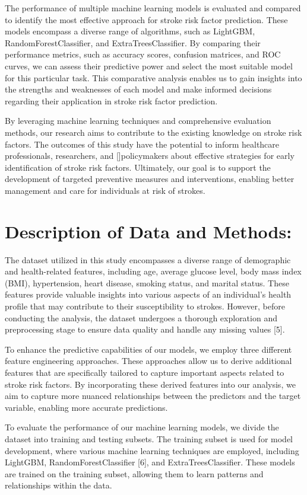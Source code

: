 \documentclass{article}
\begin{document}
The performance of multiple machine learning models is evaluated and compared to identify the most effective approach for stroke risk factor prediction. These models encompass a diverse range of algorithms, such as LightGBM, RandomForestClassifier, and ExtraTreesClassifier. By comparing their performance metrics, such as accuracy scores, confusion matrices, and ROC curves, we can assess their predictive power and select the most suitable model for this particular task. This comparative analysis enables us to gain insights into the strengths and weaknesses of each model and make informed decisions regarding their application in stroke risk factor prediction.

By leveraging machine learning techniques and comprehensive evaluation methods, our research aims to contribute to the existing knowledge on stroke risk factors. The outcomes of this study have the potential to inform healthcare professionals, researchers, and []policymakers about effective strategies for early identification of stroke risk factors. Ultimately, our goal is to support the development of targeted preventive measures and interventions, enabling better management and care for individuals at risk of strokes.

\section{Description of Data and Methods:}
The dataset utilized in this study encompasses a diverse range of demographic and health-related features, including age, average glucose level, body mass index (BMI), hypertension, heart disease, smoking status, and marital status. These features provide valuable insights into various aspects of an individual's health profile that may contribute to their susceptibility to strokes. However, before conducting the analysis, the dataset undergoes a thorough exploration and preprocessing stage to ensure data quality and handle any missing values [5].

To enhance the predictive capabilities of our models, we employ three different feature engineering approaches. These approaches allow us to derive additional features that are specifically tailored to capture important aspects related to stroke risk factors. By incorporating these derived features into our analysis, we aim to capture more nuanced relationships between the predictors and the target variable, enabling more accurate predictions.

To evaluate the performance of our machine learning models, we divide the dataset into training and testing subsets. The training subset is used for model development, where various machine learning techniques are employed, including LightGBM, RandomForestClassifier [6], and ExtraTreesClassifier. These models are trained on the training subset, allowing them to learn patterns and relationships within the data.
\end{document}
